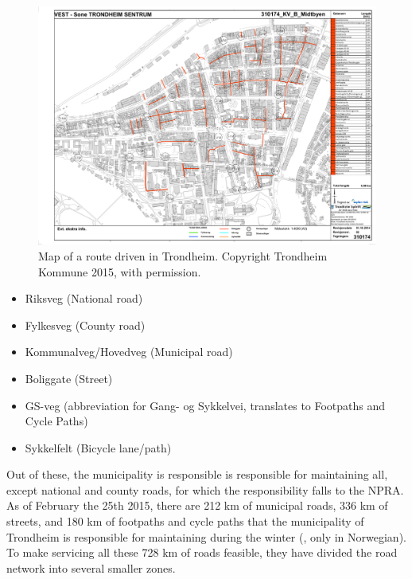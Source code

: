 \begin{landscape}
\begin{figure}[thbp]
    \centerline{\includegraphics[height=0.945\textwidth]{figures/Routes/PreExisting/310174.pdf}}
    \caption{Map of a route driven in Trondheim. Copyright Trondheim Kommune 2015, with permission.}
    \label{fig:map_KV_B_used}
\end{figure}
\end{landscape}

\begin{itemize}
    \item Riksveg (National road)
    \item Fylkesveg (County road)
    \item Kommunalveg/Hovedveg (Municipal road)
    \item Boliggate (Street)
    \item GS-veg (abbreviation for Gang- og Sykkelvei, translates to Footpaths and Cycle Paths) %
    \item Sykkelfelt (Bicycle lane/path)
\end{itemize}


Out of these, the municipality is responsible is responsible for maintaining all, except national and county roads, for which the responsibility falls to the NPRA. As of February the 25th 2015, there are 212 km of municipal roads, 336 km of streets, and 180 km of footpaths and cycle paths that the municipality of Trondheim is responsible for maintaining during the winter (\citep{trondheimKommuneVinterdriftNettside}, only in Norwegian). To make servicing all these 728 km of roads feasible, they have divided the road network into several smaller zones.

